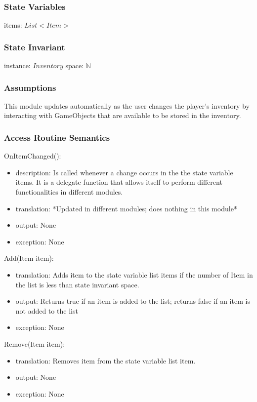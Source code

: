 \documentclass[12pt]{article}
\begin{document}
\subsubsection* {State Variables}

items: $List<Item>$\\

\subsubsection* {State Invariant}

instance: $Inventory$
space: $\mathbb{N}$

\subsubsection* {Assumptions}

This module updates automatically as the user changes the player's inventory by interacting with GameObjects that are available to be stored in the inventory.

\subsubsection* {Access Routine Semantics}

\noindent OnItemChanged():
\begin{itemize}
\item description: Is called whenever a change occurs in the the state variable items. It is a delegate function that allows itself to perform different functionalities in different modules.
\item translation: *Updated in different modules; does nothing in this module*
\item output: None
\item exception: None
\end{itemize}

\noindent Add(Item item):
\begin{itemize}
\item translation: Adds item to the state variable list items if the number of Item in the list is less than state invariant space.
\item output: Returns true if an item is added to the list; returns false if an item is not added to the list
\item exception: None
\end{itemize}

\noindent Remove(Item item):
\begin{itemize}
\item translation: Removes item from the state variable list item.
\item output: None
\item exception: None
\end{itemize}
\end{document}
